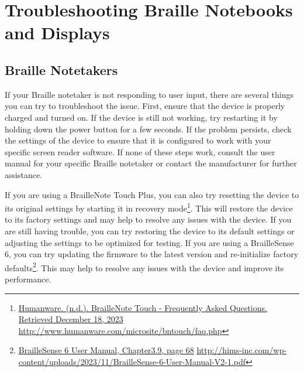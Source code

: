 \hypertarget{trouble2}{}\chapter[\raggedright Troubleshooting Braille Notebooks and Displays\hfill\break ]{Troubleshooting Braille Notebooks and Displays}\label{trouble2}
\minitoc \newpage
\hypertarget{notebook2}{}\section{Braille Notetakers}\label{notebook}
If your Braille notetaker is not responding to user input, there are several things you can try to troubleshoot the issue. First, ensure that the device is properly charged and turned on. If the device is still not working, try restarting it by holding down the power button for a few seconds. If the problem persists, check the settings of the device to ensure that it is configured to work with your specific screen reader software. If none of these steps work, consult the user manual for your specific Braille notetaker or contact the manufacturer for further assistance.

If you are using a BrailleNote Touch Plus, you can also try resetting the device to its original settings by starting it in recovery mode\footnote{\raggedright \href{http://www.humanware.com/microsite/bntouch/faq.php}{Humanware. (n.d.). BrailleNote Touch - Frequently Asked Questions. Retrieved December 18, 2023} \url{http://www.humanware.com/microsite/bntouch/faq.php}}. This will restore the device to its factory settings and may help to resolve any issues with the device. If you are still having trouble, you can try restoring the device to its default settings or adjusting the settings to be optimized for testing. If you are using a BrailleSense 6, you can try updating the firmware to the latest version and re-initialize factory defaults\footnote{\raggedright \href{http://hims-inc.com/wp-content/uploads/2023/11/BrailleSense-6-User-Manual-V2-1.pdf}{BrailleSense 6 User Manual, Chapter3.9, page 68} \url{http://hims-inc.com/wp-content/uploads/2023/11/BrailleSense-6-User-Manual-V2-1.pdf}}. This may help to resolve any issues with the device and improve its performance.

